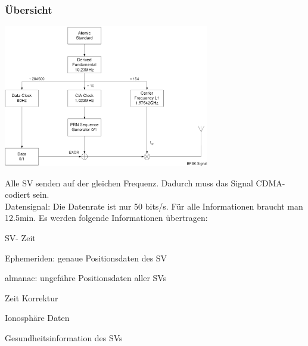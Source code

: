 	\subsubsection{Übersicht}
		\begin{minipage}{9cm}
      		\includegraphics[width=9cm]{./bilder/GPS-Signalaufbau}
        \end{minipage}
		\begin{minipage}{10cm}
        	Alle SV senden auf der gleichen Frequenz. Dadurch muss das
        	Signal CDMA- codiert sein.\\
        	Datensignal: Die Datenrate ist nur 50 bits/s. Für alle Informationen	
        	braucht man 12.5min. Es werden folgende Informationen übertragen:
        	\begin{liste}
            	\item SV- Zeit
            	\item Ephemeriden: genaue Positionsdaten des SV
            	\item almanac: ungefähre Positionsdaten aller SVs
            	\item Zeit Korrektur
            	\item Ionosphäre Daten
            	\item Gesundheitsinformation des SVs
            \end{liste}
		\end{minipage} 
